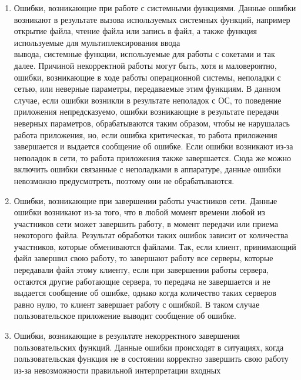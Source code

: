 \begin{enumerate}
    \item Ошибки, возникающие при работе с системными функциями. Данные
        ошибки возникают в результате вызова используемых системных
        функций, например открытие файла, чтение файла или запись в файл, а
        также функция используемые для мультиплексирования ввода\\вывода,
        системные функции, используемые для работы с сокетами и так далее.
        \newpar
        Причиной некорректной работы могут быть, хотя и маловероятно,
        ошибки, возникающие в ходе работы операционной системы,
        неполадки с сетью, или неверные параметры, передаваемые этим
        функциям. В данном случае, если ошибки возникли в результате
        неполадок с ОС, то поведение приложения непредсказуемо, ошибки
        возникающие в результате передачи неверных параметров,
        обрабатываются таким образом, чтобы не нарушалась работа
        приложения, но, если ошибка критическая, то работа приложения
        завершается и выдается сообщение об ошибке. Если ошибки возникают
        из-за неполадок в сети, то работа приложения также завершается.
        \newpar
        Сюда же можно включить ошибки связанные с неполадками в аппаратуре,
        данные ошибки невозможно предусмотреть, поэтому они не
        обрабатываются.
    \item Ошибки, возникающие при завершении работы участников сети.
        Данные ошибки возникают из-за того, что в любой момент времени
        любой из участников сети может завершить работу, в момент передачи
        или приема некоторого файла. Результат обработки таких ошибок
        зависит от количества участников, которые обмениваются файлами.
        \newpar
        Так, если клиент, принимающий файл завершил свою работу, то
        завершают работу все серверы, которые передавали файл этому
        клиенту, если при завершении работы сервера, остаются другие
        работающие сервера, то передача не завершается и не выдается
        сообщение об ошибке, однако когда количество таких серверов равно
        нулю, то клиент завершает работу с ошибкой. В таком случае
        пользовательское приложение выводит сообщение об ошибке.
    \item  Ошибки, возникающие в результате некорректного завершения
        пользовательских функций. Данные ошибки происходят в ситуациях,
        когда пользовательская функция не в состоянии корректно завершить
        свою работу из-за невозможности правильной интерпретации входных

\end{enumerate}
